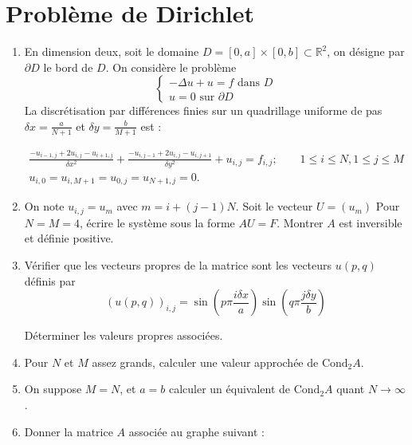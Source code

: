 \documentclass[a4paper]{article}
\begin{document}
\section{Problème de Dirichlet}
\begin{enumerate}
\item En dimension deux, soit le domaine  $D = [0, a] \times [0, b]\subset \mathbb{R}^2$, on désigne par $\partial D$ le bord de $D$. On considère le
problème
\[\left\{\begin{array}{l}
-\Delta u + u= f \mbox{ dans }D\\
u =0 \mbox{ sur }\partial D
\end{array}\right.
\]
La discrétisation par différences finies sur un quadrillage uniforme de pas $\delta x = \frac{a}{N+1}$ et $\delta y = \frac{b}{M+1}$
est : 

\begin{equation}
\begin{array}{l}
\displaystyle \frac {-u_{i-1,j} + 2u_{i,j}-u_{i+1,j}}{\delta x^2} +
\frac {-u_{i,j-1} + 2u_{i,j}-u_{i,j+1}}{\delta y^2}+u_{i,j}= f_{i,j} ;
 \qquad 1 \leq i  \leq N, 1 \leq j  \leq M \\
u_{i,0} = u_{i,M+1} = u_{0,j} = u_{N+1,j}=0.
\end{array}
\end{equation}

\item On note $u_{i,j}=u_m$ avec $m = i + (j-1)N$. Soit le vecteur $U = (u_m)$  Pour  $N = M = 4$, écrire le système
sous la forme $AU = F$. Montrer $A$ est inversible et définie positive.
\item Vérifier que les vecteurs propres de la matrice sont les vecteurs $u(p,q)$ définis par
\[(u(p,q))_{i,j} = \sin\left(p\pi \frac{i\delta x}{a}\right)\sin\left(q\pi \frac{j\delta y}{b}\right)
\]

Déterminer les valeurs propres associées.
\item Pour $N$ et $M$ assez grands, calculer une valeur approchée de $\mbox{Cond}_2A$.
\item On suppose $M=N$, et $a=b$ calculer un équivalent de  $\mbox{Cond}_2A$ quant $N\to \infty$.

\item Donner la matrice $A$ associée au graphe suivant :

\begin{center}


\end{center}
\end{enumerate}
\end{document}
